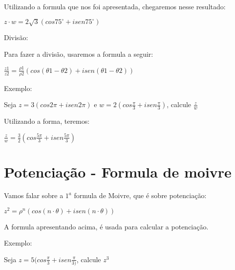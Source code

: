 \documentclass[]{article}
\begin{document}
\begin{large}
\begin{flushleft}
Utilizando a formula que nos foi apresentada, chegaremos nesse resultado: \vspace{.3cm}

\begin{center}
    $z \cdot w = 2\sqrt{3}(cos75^\circ+isen75^\circ)$ \vspace{.3cm}
\end{center}

Divisão: \vspace{.3cm}

Para fazer a divisão, usaremos a formula a seguir: \vspace{.3cm}

\begin{center}
    $\frac{z1}{z2}=\frac{\rho1}{\rho2}(cos(\theta1-\theta2) + isen(\theta1 - \theta2))$ \vspace{.3cm}
\end{center}

Exemplo: \vspace{.3cm}

Seja $z=3(cos2\pi+isen2\pi)$ e $w=2(cos\frac{\pi}{3} + isen\frac{\pi}{3})$, calcule $\frac{z}{w}$

Utilizando a forma, teremos: \vspace{.3cm}

\begin{center}
    $\frac{z}{w}=\frac{3}{2}(cos\frac{5\pi}{3} + isen\frac{5\pi}{3})$ \vspace{.3cm}
\end{center}

\section{Potenciação - Formula de moivre}

Vamos falar sobre a $1^a$ formula de Moivre, que é sobre potenciação: \vspace{.3cm}

\begin{center}
    $z^2=\rho^n(cos(n \cdot \theta)+isen(n \cdot \theta))$ \vspace{.3cm}
\end{center}

A formula apresentando acima, é usada para calcular a potenciação.

Exemplo: \vspace{.3cm}

Seja $z=5(cos\frac{\pi}{3} + isen\frac{\pi}{3)}$, calcule $z^3$ \vspace{.3cm}


\end{flushleft}
\end{large}
\end{document}

